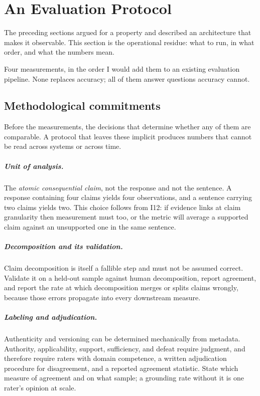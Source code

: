 \chapter{An Evaluation Protocol}
\label{ch:evaluation}
\label{sec:evaluation}

The preceding sections argued for a property and described an architecture that makes it
observable. This section is the operational residue: what to run, in what order, and what
the numbers mean.

Four measurements, in the order I would add them to an existing evaluation
pipeline. None replaces accuracy; all of them answer questions accuracy cannot.

\section{Methodological commitments}
\label{sec:method}

Before the measurements, the decisions that determine whether any of them are
comparable. A protocol that leaves these implicit produces numbers that cannot be read
across systems or across time.

\paragraph{Unit of analysis.} The \emph{atomic consequential claim}, not the response
and not the sentence. A response containing four claims yields four observations, and a
sentence carrying two claims yields two. This choice follows from I12: if evidence links
at claim granularity then measurement must too, or the metric will average a supported
claim against an unsupported one in the same sentence.

\paragraph{Decomposition and its validation.} Claim decomposition is itself a fallible
step and must not be assumed correct. Validate it on a held-out sample against human
decomposition, report agreement, and report the rate at which decomposition merges or
splits claims wrongly, because those errors propagate into every downstream measure.

\paragraph{Labeling and adjudication.} Authenticity and versioning can be determined
mechanically from metadata. Authority, applicability, support, sufficiency, and defeat
require judgment, and therefore require raters with domain competence, a written
adjudication procedure for disagreement, and a reported agreement statistic. State which
measure of agreement and on what sample; a grounding rate without it is one rater's
opinion at scale.

